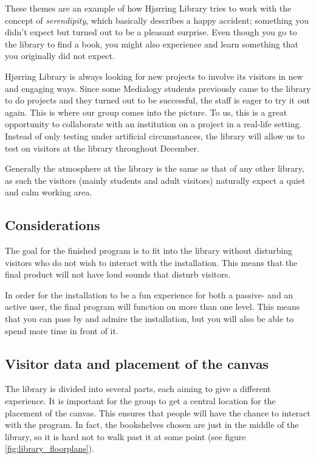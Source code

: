 These themes are an example of how Hj{\o}rring Library tries to work with the concept of \textit{serendipity}, which basically describes a happy accident; something you didn't expect but turned out to be a pleasant surprise. Even though you go to the library to find a book, you might also experience and learn something that you originally did not expect.

Hj{\o}rring Library is always looking for new projects to involve its visitors in new and engaging ways. Since some Medialogy students previously came to the library to do projects and they turned out to be successful, the staff is eager to try it out again. This is where our group comes into the picture. To us, this is a great opportunity to collaborate with an institution on a project in a real-life setting. Instead of only testing under artificial circumstances, the library will allow us to test on visitors at the library throughout December.

Generally the atmosphere at the library is the same as that of any other library, as such the visitors (mainly students and adult visitors) naturally expect a quiet and calm working area.

\subsection{Considerations}
The goal for the finished program is to fit into the library without disturbing visitors who do not wish to interact with the installation. This means that the final product will not have loud sounds that disturb visitors.

In order for the installation to be a fun experience for both a passive- and an active user, the final program will function on more than one level. This means that you can pass by and admire the installation, but you will also be able to spend more time in front of it.

\subsection{Visitor data and placement of the canvas}
The library is divided into several parts, each aiming to give a different experience. It is important for the group to get a central location for the placement of the canvas. This ensures that people will have the chance to interact with the program. In fact, the bookshelves chosen are just in the middle of the library, so it is hard not to walk past it at some point (see figure \ref{fig:library_floorplans}).

